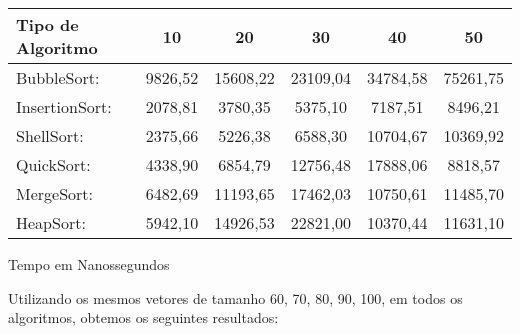 \documentclass{article}
\begin{document}
	\begin{center}
		\vspace{0.5cm}
		\begin{tabular}[htbp]{| l |c |c |c |c |c  |}%
			\hline 
			Tipo de Algoritmo& 10&20&30&40&50\\
			\hline %
			BubbleSort: &9826,52 &15608,22&23109,04&34784,58& 75261,75\\ %
			\hline
			InsertionSort: &2078,81 &3780,35&5375,10&7187,51& 8496,21\\ %
			\hline	
			ShellSort: &2375,66 &5226,38&6588,30&10704,67& 10369,92\\ %
			\hline	
			QuickSort: &4338,90 &6854,79&12756,48&17888,06&8818,57 \\ %
			\hline	
			MergeSort: & 6482,69 &11193,65&17462,03&10750,61& 11485,70 \\ %
			\hline		
			HeapSort: & 5942,10&14926,53&22821,00&10370,44&11631,10 \\ %
			\hline
			
			
		\end{tabular}
		
		Tempo em Nanossegundos
	
\end{center}	

		

	
\vspace{0.5cm}
	\indent Utilizando os mesmos vetores de tamanho 60, 70, 80, 90, 100, em todos os algoritmos, obtemos os seguintes resultados:
\end{document}
